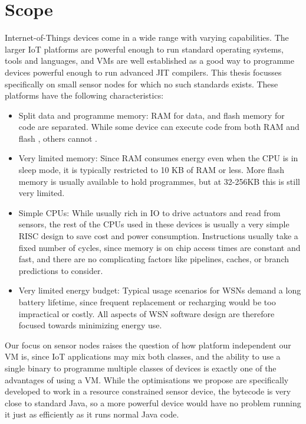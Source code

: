 \section{Scope}
\label{sec-introduction-scope}
Internet-of-Things devices come in a wide range with varying capabilities. The larger IoT platforms are powerful enough to run standard operating systems, tools and languages, and VMs are well established as a good way to programme devices powerful enough to run advanced JIT compilers. This thesis focusses specifically on small sensor nodes for which no such standards exists. These platforms have the following characteristics:
\begin{itemize}
	\item Split data and programme memory: RAM for data, and flash memory for code are separated. While some device can execute code from both RAM and flash \cite{TexasInstrumentsIncorporated:MSP430F1611Datasheet}, others cannot \cite{Atmel:ATMEGA128Datasheet}.
	\item Very limited memory: Since RAM consumes energy even when the CPU is in sleep mode, it is typically restricted to 10 KB of RAM or less. More flash memory is usually available to hold programmes, but at 32-256KB this is still very limited.
	\item Simple CPUs: While usually rich in IO to drive actuators and read from sensors, the rest of the CPUs used in these devices is usually a very simple RISC design to save cost and power consumption. Instructions usually take a fixed number of cycles, since memory is on chip access times are constant and fast, and there are no complicating factors like pipelines, caches, or branch predictions to consider.
	\item Very limited energy budget: Typical usage scenarios for WSNs demand a long battery lifetime, since frequent replacement or recharging would be too impractical or costly. All aspects of WSN software design are therefore focused towards minimizing energy use.
\end{itemize}

Our focus on sensor nodes raises the question of how platform independent our VM is, since IoT applications may mix both classes, and the ability to use a single binary to programme multiple classes of devices is exactly one of the advantages of using a VM. While the optimisations we propose are specifically developed to work in a resource constrained sensor device, the bytecode is very close to standard Java, so a more powerful device would have no problem running it just as efficiently as it runs normal Java code.

